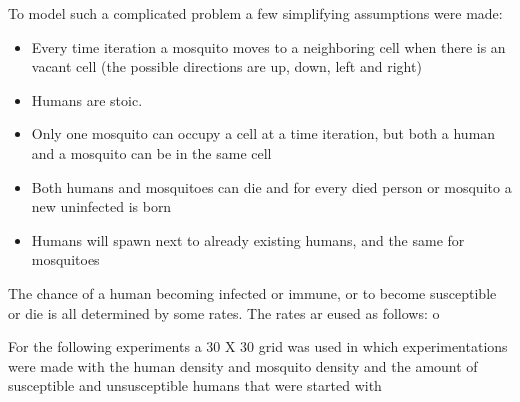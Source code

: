 \documentclass[a4paper]{report}
\begin{document}
To model such a complicated problem a few simplifying assumptions were made:

\begin{itemize}
    \item Every time iteration a mosquito moves to a neighboring cell when
        there is an vacant cell (the possible directions are up, down, left and
        right)
    \item Humans are stoic.
    \item Only one mosquito can occupy a cell at a time iteration, but both a
        human and a mosquito can be in the same cell
    \item Both humans and mosquitoes can die and for every died person or
        mosquito a new uninfected is born
    \item Humans will spawn next to already existing humans, and the same for
        mosquitoes
\end{itemize}

The chance of a human becoming infected or immune, or to become susceptible or
die is all determined by some rates.
The rates ar eused as follows:
o

For the following experiments a 30 X 30 grid was used in which experimentations
were made with the human density and mosquito density and the amount of
susceptible and unsusceptible humans that were started with


\end{document}

